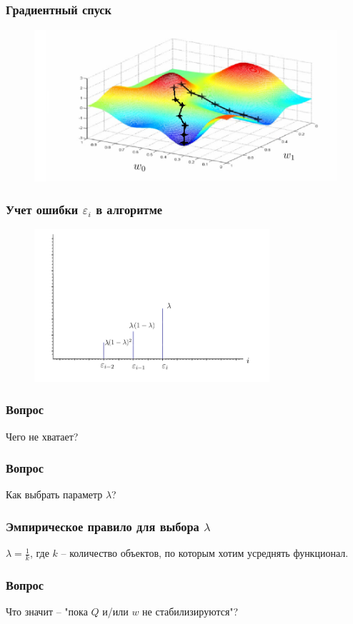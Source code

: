 \documentclass[12pt]{beamer}
\begin{document}
\begin{frame}\frametitle{Градиентный спуск}
\begin{figure}[htbp]
  \includegraphics[height=160pt, keepaspectratio = true]{images/gradient_descent2}   
\end{figure}
\end{frame}


\begin{frame}\frametitle{Учет ошибки $\varepsilon_i$ в алгоритме}
\begin{figure}[htbp]
  \includegraphics[height=160pt, keepaspectratio = true]{images/l2}   
\end{figure}
\end{frame}

\begin{frame}\frametitle{Вопрос}
Чего не хватает?
\end{frame}

\begin{frame}\frametitle{Вопрос}
Как выбрать параметр $\lambda$?
\end{frame}

\begin{frame}\frametitle{Эмпирическое правило для выбора $\lambda$}
$\lambda = \frac{1}{k}$, где $k$ -- количество объектов, по которым хотим усреднять функционал.
\end{frame}

\begin{frame}\frametitle{Вопрос}
Что значит -- "пока $Q$ и/или $w$ не стабилизируются"?
\end{frame}
\end{document}

